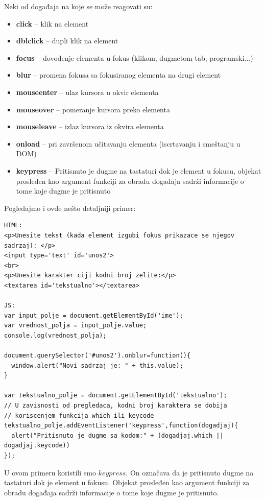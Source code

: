Neki od događaja na koje se može reagovati su:
\begin{itemize}
\item \textbf{click} – klik na element
\item \textbf{dblclick} – dupli klik na element
\item \textbf{focus}  – dovođenje elementa u fokus (klikom, dugmetom tab, programski...)
\item \textbf{blur} – promena fokusa sa fokusiranog elementa na drugi element
\item \textbf{mouseenter}  – ulaz kursora u okvir elementa
\item \textbf{mouseover} – pomeranje kursora preko elementa
\item \textbf{mouseleave} – izlaz kursora iz okvira elementa
\item \textbf{onload} – pri završenom učitavanju elementa (iscrtavanju i smeštanju u DOM)
\item \textbf{keypress}  – Pritisnuto je dugme na tastaturi dok je element u fokusu, objekat prosleđen kao argument funkciji za obradu događaja sadrži informacije o tome koje dugme je
pritisnuto
\end{itemize}
Pogledajmo i ovde nešto detaljniji primer:
\begin{lstlisting}[backgroundcolor = \color{lightgray}, breaklines=true]
HTML:
<p>Unesite tekst (kada element izgubi fokus prikazace se njegov sadrzaj): </p>
<input type='text' id='unos2'> 
<br>
<p>Unesite karakter ciji kodni broj zelite:</p>
<textarea id='tekstualno'></textarea>

JS:
var input_polje = document.getElementById('ime');
var vrednost_polja = input_polje.value;
console.log(vrednost_polja);

document.querySelector('#unos2').onblur=function(){            
  window.alert("Novi sadrzaj je: " + this.value);
}
            
var tekstualno_polje = document.getElementById('tekstualno');
// U zavisnosti od pregledaca, kodni broj karaktera se dobija
// koriscenjem funkcija which ili keycode
tekstualno_polje.addEventListener('keypress',function(dogadjaj){
  alert("Pritisnuto je dugme sa kodom:" + (dogadjaj.which || dogadjaj.keycode))
});
\end{lstlisting} 

U ovom primeru koristili smo $keypress$. On označava da je pritisnuto dugme na tastaturi dok je element u fokusu. Objekat prosleđen kao argument funkciji za obradu događaja sadrži informacije o tome koje dugme je pritisnuto.

